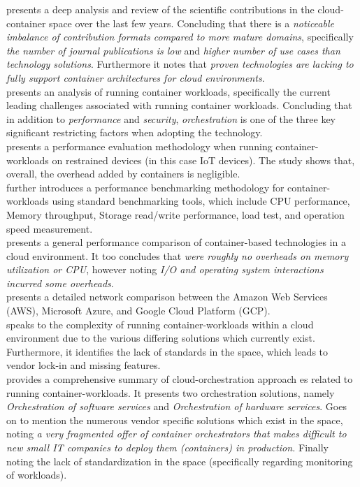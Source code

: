 \cite{pahl2017cloud} presents a deep analysis and review of the scientific contributions in the cloud-container space over the last few years.
Concluding that there is a \emph{noticeable imbalance of contribution formats compared to more mature domains}, specifically 
\emph{the number of journal publications is low} and \emph{higher number of use cases than technology solutions}. 
Furthermore it notes that \emph{proven technologies are lacking to fully support container architectures for cloud environments}. \\

\noindent \cite{https://doi.org/10.1002/cpe.5668} presents an analysis of running container workloads, specifically the current leading challenges associated with running container workloads.
Concluding that in addition to \emph{performance} and \emph{security}, \emph{orchestration} is one of the three key significant restricting factors when adopting the technology. \\

\noindent \cite{7562228} presents a performance evaluation methodology when running container-workloads on restrained devices 
(in this case IoT devices).
The study shows that, overall, the overhead added by containers is negligible. \\

\noindent \cite{POTDAR20201419} further introduces a performance benchmarking methodology for container-workloads using standard benchmarking tools, 
which include CPU performance, Memory throughput, Storage read/write performance, load test, and operation speed measurement. \\

\noindent \cite{KOZHIRBAYEV2017175} presents a general performance comparison of container-based technologies in a cloud environment. 
It too concludes that \emph{were roughly no overheads on memory utilization or CPU}, however noting \emph{I/O and operating system interactions incurred some overheads}.  \\

\noindent \cite{8500285} presents a detailed network comparison between the Amazon Web Services (AWS), Microsoft Azure, and Google Cloud Platform (GCP). \\

\noindent \cite{quint2016overcome} speaks to the complexity of running container-workloads within a cloud environment due to the various differing solutions which currently exist.
Furthermore, it identifies the lack of standards in the space, which leads to vendor lock-in and missing features. \\

\noindent \cite{7185168} provides a comprehensive summary of cloud-orchestration approach  es related to running container-workloads. It presents two orchestration solutions, namely 
\emph{Orchestration of software services} and \emph{Orchestration of hardware services}. 
Goes on to mention the numerous vendor specific solutions which exist in the space, noting 
\emph{a very fragmented offer of container orchestrators that makes difficult to new small IT companies to deploy them (containers) in production.}
Finally noting the lack of standardization in the space (specifically regarding monitoring of workloads).